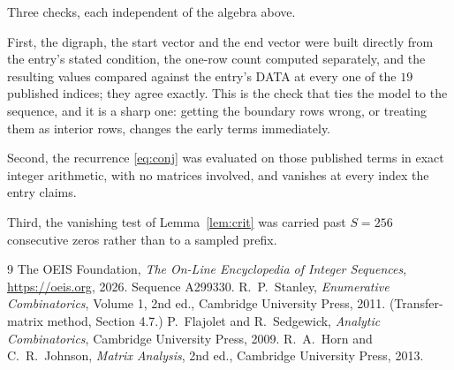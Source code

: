 \documentclass[11pt,a4paper]{article}
\theoremstyle{plain}
\theoremstyle{definition}
\begin{document}
Three checks, each independent of the algebra above.

First, the digraph, the start vector and the end vector were built directly from the
entry's stated condition, the one-row count computed separately, and the resulting values
compared against the entry's DATA at every one of the $19$ published indices; they
agree exactly. This is the check that ties the model to the sequence, and it is a sharp one:
getting the boundary rows wrong, or treating them as interior rows, changes the early terms
immediately.

Second, the recurrence \eqref{eq:conj} was evaluated on those published terms in exact
integer arithmetic, with no matrices involved, and vanishes at every index the entry claims.

Third, the vanishing test of Lemma~\ref{lem:crit} was carried past $S=256$ consecutive
zeros rather than to a sampled prefix.

\begin{thebibliography}{9}
 The OEIS Foundation, \emph{The On-Line Encyclopedia of Integer
Sequences}, \url{https://oeis.org}, 2026. Sequence A299330.
 R.~P.~Stanley, \emph{Enumerative Combinatorics}, Volume 1, 2nd ed.,
Cambridge University Press, 2011. (Transfer-matrix method, Section 4.7.)
 P.~Flajolet and R.~Sedgewick, \emph{Analytic Combinatorics}, Cambridge
University Press, 2009.
 R.~A.~Horn and C.~R.~Johnson, \emph{Matrix Analysis}, 2nd ed., Cambridge
University Press, 2013.
\end{thebibliography}
\end{document}
